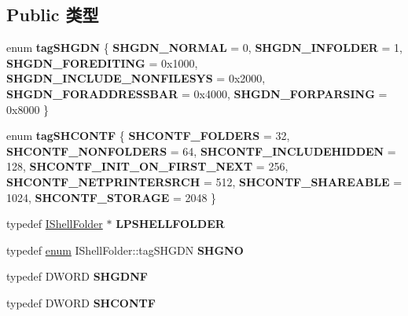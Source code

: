 \subsection*{Public 类型}
\begin{DoxyCompactItemize}
\item 
\mbox{\label{interface_i_shell_folder_a439b75036d7c25c6ae39d6421f618178}} 
enum {\bfseries tag\+S\+H\+G\+DN} \{ \newline
{\bfseries S\+H\+G\+D\+N\+\_\+\+N\+O\+R\+M\+AL} = 0, 
{\bfseries S\+H\+G\+D\+N\+\_\+\+I\+N\+F\+O\+L\+D\+ER} = 1, 
{\bfseries S\+H\+G\+D\+N\+\_\+\+F\+O\+R\+E\+D\+I\+T\+I\+NG} = 0x1000, 
{\bfseries S\+H\+G\+D\+N\+\_\+\+I\+N\+C\+L\+U\+D\+E\+\_\+\+N\+O\+N\+F\+I\+L\+E\+S\+YS} = 0x2000, 
\newline
{\bfseries S\+H\+G\+D\+N\+\_\+\+F\+O\+R\+A\+D\+D\+R\+E\+S\+S\+B\+AR} = 0x4000, 
{\bfseries S\+H\+G\+D\+N\+\_\+\+F\+O\+R\+P\+A\+R\+S\+I\+NG} = 0x8000
 \}
\item 
\mbox{\label{interface_i_shell_folder_a907db8b011edc84598bb6486b3d80b3e}} 
enum {\bfseries tag\+S\+H\+C\+O\+N\+TF} \{ \newline
{\bfseries S\+H\+C\+O\+N\+T\+F\+\_\+\+F\+O\+L\+D\+E\+RS} = 32, 
{\bfseries S\+H\+C\+O\+N\+T\+F\+\_\+\+N\+O\+N\+F\+O\+L\+D\+E\+RS} = 64, 
{\bfseries S\+H\+C\+O\+N\+T\+F\+\_\+\+I\+N\+C\+L\+U\+D\+E\+H\+I\+D\+D\+EN} = 128, 
{\bfseries S\+H\+C\+O\+N\+T\+F\+\_\+\+I\+N\+I\+T\+\_\+\+O\+N\+\_\+\+F\+I\+R\+S\+T\+\_\+\+N\+E\+XT} = 256, 
\newline
{\bfseries S\+H\+C\+O\+N\+T\+F\+\_\+\+N\+E\+T\+P\+R\+I\+N\+T\+E\+R\+S\+R\+CH} = 512, 
{\bfseries S\+H\+C\+O\+N\+T\+F\+\_\+\+S\+H\+A\+R\+E\+A\+B\+LE} = 1024, 
{\bfseries S\+H\+C\+O\+N\+T\+F\+\_\+\+S\+T\+O\+R\+A\+GE} = 2048
 \}
\item 
\mbox{\label{interface_i_shell_folder_ae1974ac986bc389bf2ef1409fd7b72a8}} 
typedef \hyperlink{interface_i_shell_folder}{I\+Shell\+Folder} $\ast$ {\bfseries L\+P\+S\+H\+E\+L\+L\+F\+O\+L\+D\+ER}
\item 
\mbox{\label{interface_i_shell_folder_a280ab0baec53f9a0a51c956643f9a431}} 
typedef \hyperlink{interfaceenum}{enum} I\+Shell\+Folder\+::tag\+S\+H\+G\+DN {\bfseries S\+H\+G\+NO}
\item 
\mbox{\label{interface_i_shell_folder_af425fcea97277c8e39004ffc831514fb}} 
typedef D\+W\+O\+RD {\bfseries S\+H\+G\+D\+NF}
\item 
\mbox{\label{interface_i_shell_folder_afd4c6835e00b34808d708b05de4d4aa7}} 
typedef D\+W\+O\+RD {\bfseries S\+H\+C\+O\+N\+TF}
\end{DoxyCompactItemize}
